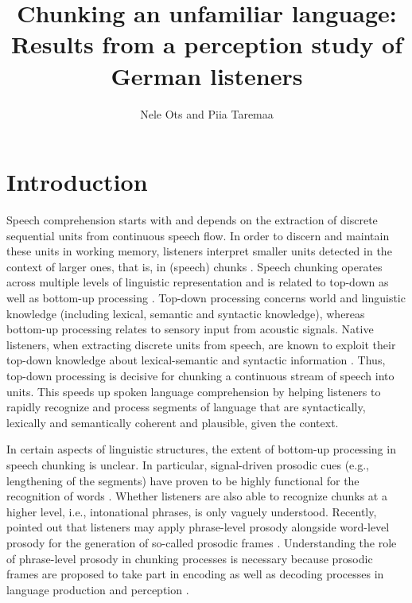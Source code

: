\documentclass[output=paper]{langscibook}
\author{Nele Ots\orcid{0000-0002-4660-434X}\affiliation{Goethe-University Frankfurt} and Piia Taremaa\orcid{0000-0003-1535-9449}\affiliation{University of Tartu}}
\title[Chunking an unfamiliar language]{Chunking an unfamiliar language: Results from a perception study of German listeners}
\begin{document}
\maketitle

	\section{Introduction}
	
	Speech comprehension starts with and depends on the extraction of discrete sequential units  from continuous speech flow. In order to discern and maintain these units in working memory, listeners interpret smaller units detected in the context of larger ones, that is, in (speech) chunks  \citep[][]{dahanFerreira2019, christiansenChater2016}. Speech chunking operates across multiple levels of linguistic representation and is related to top-down as well as bottom-up processing \citep[see, e.g.,][]{dahanFerreira2019}. Top-down processing concerns world  and linguistic knowledge (including lexical, semantic and syntactic knowledge), whereas bottom-up processing relates to sensory input from acoustic signals. Native listeners, when extracting discrete units from speech, are known to exploit their top-down knowledge about lexical-semantic and syntactic information \citep[][]{mattysEtAl2005}. Thus, top-down processing is decisive for chunking a continuous stream of speech into units. This speeds up spoken language comprehension by helping listeners to rapidly recognize and process segments of language that are syntactically, lexically and semantically coherent and plausible, given the context.
	
	In certain aspects of linguistic structures, the extent of bottom-up processing in speech chunking is unclear. In particular, signal-driven prosodic cues (e.g., lengthening of the segments) have proven to be highly functional for the recognition of words \citep[e.g.,][]{whiteEtAl2020}. Whether listeners are also able to recognize chunks at a higher level, i.e., intonational phrases, is only vaguely understood. Recently, \citet[][]{ordinEtAl2017} pointed out that listeners may apply phrase-level prosody alongside word-level prosody for the generation of so-called prosodic frames \citep{keatingShattuckHufnagel2002, schildEtAl2014, silbertEtAl2014}. Understanding the role of phrase-level prosody in chunking processes is necessary because prosodic frames are proposed to take part in encoding as well as decoding processes in language production and perception \citep[][]{keatingShattuckHufnagel2002, schildEtAl2014, silbertEtAl2014}.
	
\end{document}
